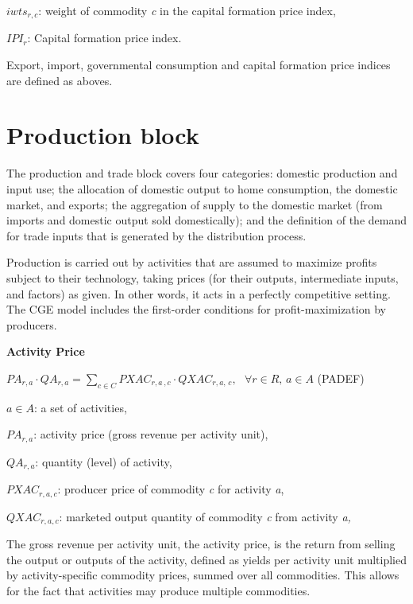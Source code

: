 \documentclass[10pt,a4paper,titlepage,dvipdfmx]{book}
\begin{document}
\begin{flushleft}
$iwts_{r,c}$: weight of commodity \textit{c} in the capital formation price index,

$IPI_{r}$: Capital formation price index.
\end{flushleft}

Export, import, governmental consumption and capital formation price indices are defined as aboves. 

\section{\label{sec:ProBlo}Production block}

The production and trade block covers four categories: domestic production and input use; the allocation of domestic output to home consumption, the domestic market, and exports; the aggregation of supply to the domestic market (from imports and domestic output sold domestically); and the definition of the demand for trade inputs that is generated by the distribution process.

Production is carried out by activities that are assumed to maximize profits subject to their technology, taking prices (for their outputs, intermediate inputs, and factors) as given. In other words, it acts in a perfectly competitive setting. The CGE model includes the first-order conditions for profit-maximization by producers. 

\begin{flushleft}\textbf{Activity Price}\end{flushleft}


\begin{center}$PA_{r,a}\cdot QA_{r,a}=\sum _{c\in C}PXAC_{r,a\,,c}\cdot QXAC_{r,a,\,c},\,\,\,\,\forall r\in R,\,a\in A$ (PADEF)
\end{center}
\begin{flushleft}
$a\in A$: a set of activities,

$PA_{r,a}$: activity price (gross revenue per activity unit),

$QA_{r,a}$: quantity (level) of activity,

$PXAC_{r,a,c}$: producer price of commodity \textit{c} for activity \textit{a},

$QXAC_{r,a,c}$: marketed output quantity of commodity \textit{c} from activity \textit{a,}
\end{flushleft}

The gross revenue per activity unit, the activity price, is the return from selling the output or outputs of the activity, defined as yields per activity unit multiplied by activity-specific commodity prices, summed over all commodities. This allows for the fact that activities may produce multiple commodities.
\end{document}
